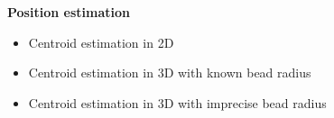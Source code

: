 \documentclass[final,svgnames,dvipsnames,table]{beamer}
\begin{document}
\begin{frame}[fragile]
\begin{columns}[t,totalwidth=\textwidth]
\begin{column}{0.32\textwidth}
%
%          


    
      \begin{minipage}{1\textwidth}\centering
        \begin{block}{\bf Position estimation}
        \begin{itemize}
        \item Centroid estimation in 2D 
        \item Centroid estimation in 3D with known bead radius
        \item Centroid estimation in 3D with imprecise bead radius
      \end{itemize}
        \end{block}
        \end{minipage}

        
            \end{column}
    \begin{column}{0.32\textwidth}
\end{column}
\end{columns}
\end{frame}
\end{document}

